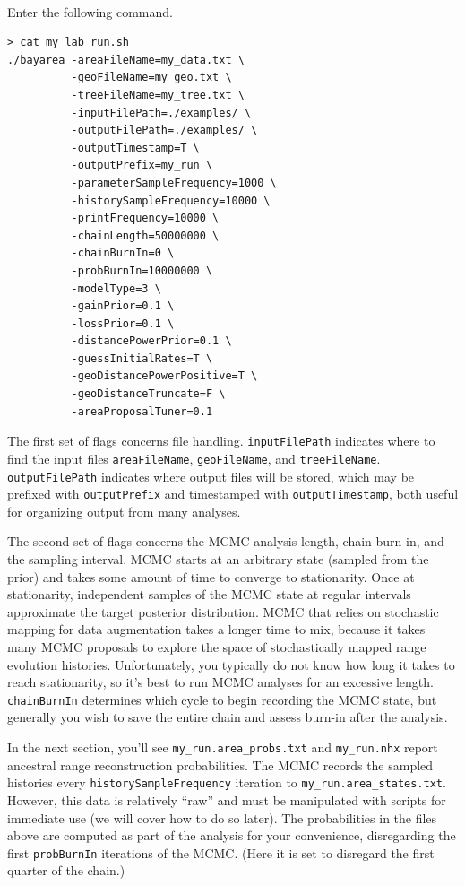 \documentclass[11pt]{article}
\newcommand{\impmark}{\strut\vadjust{\domark}}
\newcommand{\domark}{%
  \vbox to 0pt{
    \kern-\dp\strutbox
    \smash{\llap{$\rightarrow$\kern1em}}
    \vss
  }%
}
\begin{document}
\noindent \\ \impmark Enter the following command.
\begin{framed}
\begin{lstlisting}
> cat my_lab_run.sh
./bayarea -areaFileName=my_data.txt \
          -geoFileName=my_geo.txt \
          -treeFileName=my_tree.txt \
          -inputFilePath=./examples/ \
          -outputFilePath=./examples/ \
          -outputTimestamp=T \
          -outputPrefix=my_run \
          -parameterSampleFrequency=1000 \
          -historySampleFrequency=10000 \
          -printFrequency=10000 \
          -chainLength=50000000 \
          -chainBurnIn=0 \
          -probBurnIn=10000000 \
          -modelType=3 \
          -gainPrior=0.1 \
          -lossPrior=0.1 \
          -distancePowerPrior=0.1 \
          -guessInitialRates=T \
          -geoDistancePowerPositive=T \
          -geoDistanceTruncate=F \
          -areaProposalTuner=0.1
\end{lstlisting}
\end{framed}

The first set of flags concerns file handling.
\texttt{inputFilePath} indicates where to find the input files \texttt{areaFileName}, \texttt{geoFileName}, and \texttt{treeFileName}.
\texttt{outputFilePath} indicates where output files will be stored, which may be prefixed with \texttt{outputPrefix} and timestamped with \texttt{outputTimestamp}, both useful for organizing output from many analyses.

The second set of flags concerns the MCMC analysis length, chain burn-in, and the sampling interval.
MCMC starts at an arbitrary state (sampled from the prior) and takes some amount of time to converge to stationarity.
Once at stationarity, independent samples of the MCMC state at regular intervals approximate the target posterior distribution.
MCMC that relies on stochastic mapping for data augmentation takes a longer time to mix, because it takes many MCMC proposals to explore the space of stochastically mapped range evolution histories.
Unfortunately, you typically do not know how long it takes to reach stationarity, so it's best to run MCMC analyses for an excessive length.
\texttt{chainBurnIn} determines which cycle to begin recording the MCMC state, but generally you wish to save the entire chain and assess burn-in after the analysis.

In the next section, you'll see \texttt{my\_run.area\_probs.txt} and \texttt{my\_run.nhx} report ancestral range reconstruction probabilities.
The MCMC records the sampled histories every \texttt{historySampleFrequency} iteration to \texttt{my\_run.area\_states.txt}.
However, this data is relatively ``raw'' and must be manipulated with scripts for immediate use (we will cover how to do so later).
The probabilities in the files above are computed as part of the analysis for your convenience, disregarding the first \texttt{probBurnIn} iterations of the MCMC.
(Here it is set to disregard the first quarter of the chain.)
\end{document}
